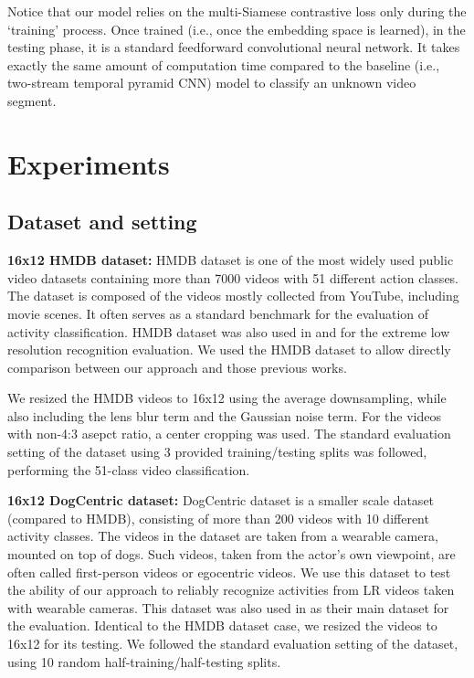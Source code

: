 \documentclass[letterpaper]{article} %
\begin{document}
Notice that our model relies on the multi-Siamese contrastive loss only during the `training' process. Once trained (i.e., once the embedding space is learned), in the testing phase, it is a standard feedforward convolutional neural network. It takes exactly the same amount of computation time compared to the baseline (i.e., two-stream temporal pyramid CNN) model to classify an unknown video segment.

\section{Experiments}

\subsection{Dataset and setting}

{\flushleft\textbf{16x12 HMDB dataset:} HMDB dataset \cite{hmdb} is one of the most widely used public video datasets containing more than 7000 videos with 51 different action classes. The dataset is composed of the videos mostly collected from YouTube, including movie scenes. It often serves as a standard benchmark for the evaluation of activity classification. HMDB dataset was also used in \cite{ryoo17privacy} and \cite{chen17} for the extreme low resolution recognition evaluation. We used the HMDB dataset to allow directly comparison between our approach and those previous works.}

We resized the HMDB videos to 16x12 using the average downsampling, while also including the lens blur term and the Gaussian noise term. For the videos with non-4:3 asepct ratio, a center cropping was used. The standard evaluation setting of the dataset using 3 provided training/testing splits was followed, performing the 51-class video classification.

{\flushleft\textbf{16x12 DogCentric dataset:} DogCentric dataset \cite{dogcentric} is a smaller scale dataset (compared to HMDB), consisting of more than 200 videos with 10 different activity classes. The videos in the dataset are taken from a wearable camera, mounted on top of dogs. Such videos, taken from the actor's own viewpoint, are often called first-person videos or egocentric videos. We use this dataset to test the ability of our approach to reliably recognize activities from LR videos taken with wearable cameras. This dataset was also used in \cite{ryoo17privacy}  as their main dataset for the evaluation. Identical to the HMDB dataset case, we resized the videos to 16x12 for its testing. We followed  the standard evaluation setting of the dataset, using 10 random half-training/half-testing splits.}
\end{document}
